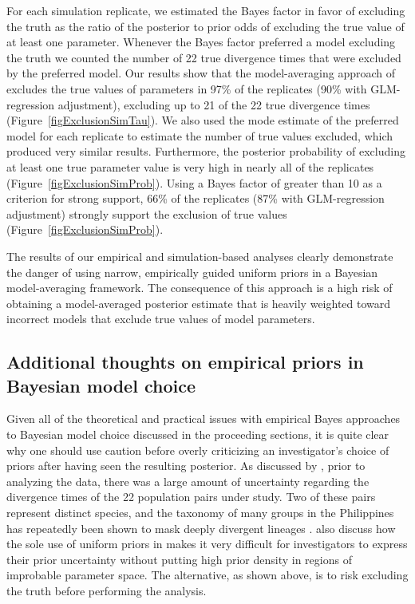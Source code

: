 \documentclass[letterpaper,12pt]{article}
\begin{document}
\begin{linenumbers}
For each simulation replicate, we estimated the Bayes factor in favor
of excluding the truth as the ratio of the posterior to prior odds of
excluding the true value of at least one parameter.
Whenever the Bayes factor preferred a model excluding the truth we counted
the number of 22 true divergence times that were excluded by the preferred
model.
Our results show that the model-averaging approach of \citet{Hickerson2013}
excludes the true values of parameters in 97\% of the replicates (90\% with
GLM-regression adjustment), excluding up to 21 of the 22 true divergence times
(Figure~\ref{figExclusionSimTau}).
We also used the mode estimate of the preferred model for each replicate to
estimate the number of true values excluded, which produced very similar
results.
Furthermore, the posterior probability of excluding at least one true parameter
value is very high in nearly all of the replicates
(Figure~\ref{figExclusionSimProb}).
Using a Bayes factor of greater than 10 as a criterion for strong support, 66\%
of the replicates (87\% with GLM-regression adjustment) strongly support the
exclusion of true values (Figure~\ref{figExclusionSimProb}).

The results of our empirical and simulation-based analyses clearly demonstrate
the danger of using narrow, empirically guided uniform priors in a Bayesian
model-averaging framework.
The consequence of this approach is a high risk of obtaining a model-averaged
posterior estimate that is heavily weighted toward incorrect models that
exclude true values of model parameters.


\subsection*{Additional thoughts on empirical priors in Bayesian model choice}
Given all of the theoretical and practical issues with empirical Bayes
approaches to Bayesian model choice discussed in the proceeding sections, it is
quite clear why one should use caution before overly criticizing an
investigator's choice of priors after having seen the resulting posterior.
As discussed by \citet{Oaks2012}, prior to analyzing the data, there was a large
amount of uncertainty regarding the divergence times of the 22 population pairs
under study.
Two of these pairs represent distinct species, and the taxonomy of many groups
in the Philippines has repeatedly been shown to mask deeply divergent lineages
\citep{RafeDiesmosAlcala2008,Linkem2010,Siler2010,Welton2010,Siler2011HerpMonographs,
    Siler2011,Siler2012,RafeStuart2012,LinkemBrown2013}.
\citet{Oaks2012} also discuss how the sole use of uniform priors in \msb makes
it very difficult for investigators to express their prior uncertainty without
putting high prior density in regions of improbable parameter space.
The alternative, as shown above, is to risk excluding the truth before
performing the analysis.


\end{linenumbers}
\end{document}
